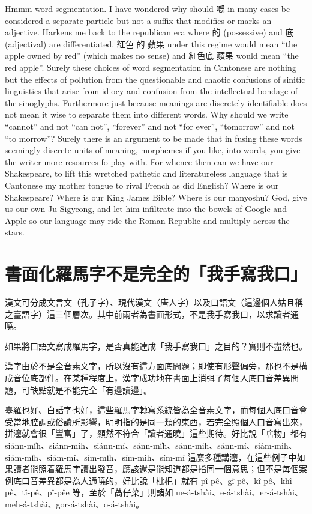 Hmmm word segmentation. I have wondered why should 嘅 in many cases be considered a separate particle but not a suffix that modifies or marks an adjective. Harkens me back to the republican era where 的 (possessive) and 底 (adjectival) are differentiated. 紅色 的 蘋果 under this regime would mean “the apple owned by red” (which makes no sense) and 紅色底 蘋果  would mean “the red apple”. Surely these choices of word segmentation in Cantonese are nothing but the effects of pollution from the questionable and chaotic confusions of sinitic linguistics that arise from idiocy and confusion from the intellectual bondage of the  sinoglyphs.
Furthermore just because meanings are discretely identifiable does not mean it wise to separate them into different words. Why should we write “cannot” and not “can not”, “forever” and not “for ever”, “tomorrow” and not “to morrow”?
Surely there is an argument to be made that in fusing these words seemingly discrete units of meaning, morphemes if you like, into words, you give the writer more resources fo play with. For whence then can we have our Shakespeare, to lift this wretched pathetic and literatureless language that is Cantonese my mother tongue to rival French as did English? Where is our Shakespeare? Where is our King James Bible? Where is our manyoshu? God, give us our own Ju Sigyeong, and let him infiltrate into the bowels of Google and Apple so our language may ride the Roman Republic and multiply across the stars.





\section{書面化羅馬字不是完全的「我手寫我口」}

漢文可分成文言文（孔子字）、現代漢文（唐人字）以及口語文（這邊個人姑且稱之臺語字）這三個層次。其中前兩者為書面形式，不是我手寫我口，以求讀者通曉。

如果將口語文寫成羅馬字，是否真能達成「我手寫我口」之目的？實則不盡然也。

漢字由於不是全音素文字，所以沒有這方面底問題；即使有形聲偏旁，那也不是構成音位底部件。在某種程度上，漢字成功地在書面上消弭了每個人底口音差異問題，可缺點就是不能完全「有邊讀邊」。

臺羅也好、白話字也好，這些羅馬字轉寫系統皆為全音素文字，而每個人底口音會受當地腔調或俗讀所影響，明明指的是同一類的東西，若完全照個人口音寫出來，拼灋就會很「豐富」了，顯然不符合「讀者通曉」這些期待。好比說「啥物」都有 siánn-mi̍h、siánn-mih、siánn-mí、sánn-mi̍h、sánn-mih、sánn-mí、siám-mih、siám-mi̍h、siám-mí、sím-mi̍h、sím-mih、sím-mí 這麼多種講灋，在這些例子中如果讀者能照着羅馬字讀出發音，應該還是能知道都是指同一個意思；但不是每個案例底口音差異都是為人通曉的，好比說「枇杷」就有 pî-pê、gî-pê、kî-pê、khî-pê、tî-pê、pî-pêe 等，至於「萵仔菜」則諸如 ue-á-tshài、e-á-tshài、er-á-tshài、meh-á-tshài、gor-á-tshài、o-á-tshài。

